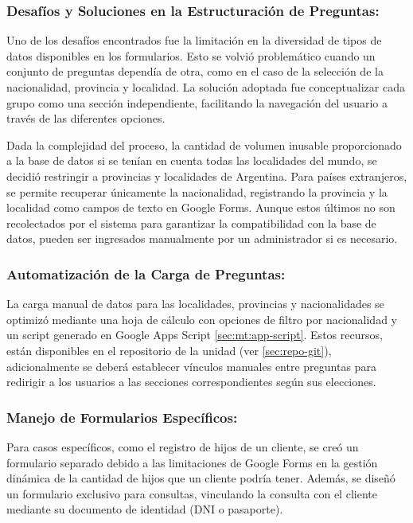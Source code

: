 \subsubsection{Desafíos y Soluciones en la Estructuración de Preguntas:}
Uno de los desafíos encontrados fue la limitación en la diversidad de tipos de datos disponibles en los formularios. Esto se volvió problemático cuando un conjunto de preguntas dependía de otra, como en el caso de la selección de la nacionalidad, provincia y localidad. La solución adoptada fue conceptualizar cada grupo como una sección independiente, facilitando la navegación del usuario a través de las diferentes opciones.

Dada la complejidad del proceso, la cantidad de volumen inusable proporcionado a la base de datos si se tenían en cuenta todas las localidades del mundo,  se decidió restringir a provincias y localidades de Argentina. Para países extranjeros, se permite recuperar únicamente la nacionalidad, registrando la provincia y la localidad como campos de texto en Google Forms. Aunque estos últimos no son recolectados por el sistema para garantizar la compatibilidad con la base de datos, pueden ser ingresados manualmente por un administrador si es necesario.

\subsubsection{Automatización de la Carga de Preguntas:}
La carga manual de datos para las localidades, provincias y nacionalidades se optimizó mediante una hoja de cálculo con opciones de filtro por nacionalidad y un script generado en Google Apps Script \ref{sec:mt:app-script}. Estos recursos, están disponibles en el repositorio de la unidad (ver \ref{sec:repo-git}), adicionalmente se deberá establecer vínculos manuales entre preguntas para redirigir a los usuarios a las secciones correspondientes según sus elecciones.

\subsubsection{Manejo de Formularios Específicos:}
Para casos específicos, como el registro de hijos de un cliente, se creó un formulario separado debido a las limitaciones de Google Forms en la gestión dinámica de la cantidad de hijos que un cliente podría tener. Además, se diseñó un formulario exclusivo para consultas, vinculando la consulta con el cliente mediante su documento de identidad (DNI o pasaporte).

